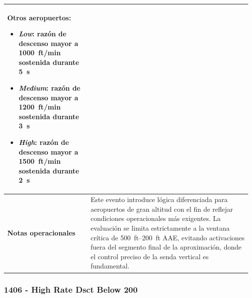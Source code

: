 \documentclass[11pt,a4paper]{article}
\begin{document}
\begin{longtable}{p{5cm} p{9.5cm}}
		\textbf{Otros aeropuertos:}
		\begin{itemize}
			\item \textit{Low}: razón de descenso mayor a \SI{1000}{ft/min} sostenida durante \SI{5}{s}
			\item \textit{Medium}: razón de descenso mayor a \SI{1200}{ft/min} sostenida durante \SI{3}{s}
			\item \textit{High}: razón de descenso mayor a \SI{1500}{ft/min} sostenida durante \SI{2}{s}
		\end{itemize} \\
		\hline
		\textbf{Notas operacionales} &
		Este evento introduce lógica diferenciada para aeropuertos de gran altitud con el fin de reflejar condiciones operacionales más exigentes. 
		La evaluación se limita estrictamente a la ventana crítica de \SIrange{500}{200}{ft} AAE, evitando activaciones fuera del segmento final de la aproximación, donde el control preciso de la senda vertical es fundamental. \\
		\hline
	\end{longtable}
	
	\subsubsection{1406 - High Rate Dsct Below 200}
	
\end{document}
